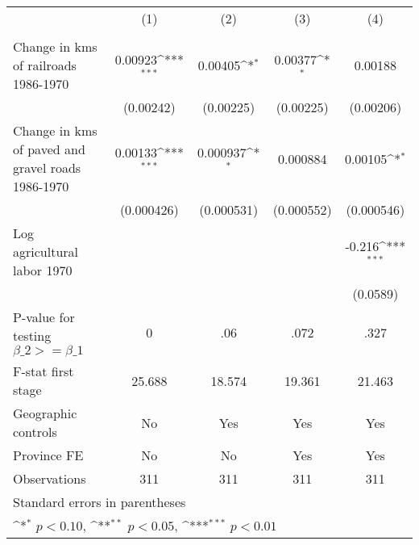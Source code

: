 {
\def\sym#1{\ifmmode^{#1}\else\(^{#1}\)\fi}
\begin{tabular}{l*{4}{c}}
\hline\hline
                &\multicolumn{1}{c}{(1)}&\multicolumn{1}{c}{(2)}&\multicolumn{1}{c}{(3)}&\multicolumn{1}{c}{(4)}\\
                &\multicolumn{1}{c}{}&\multicolumn{1}{c}{}&\multicolumn{1}{c}{}&\multicolumn{1}{c}{}\\
\hline
Change in kms of railroads 1986-1970&  0.00923\sym{***}&  0.00405\sym{*}  &  0.00377\sym{*}  &  0.00188         \\
                &(0.00242)         &(0.00225)         &(0.00225)         &(0.00206)         \\
[1em]
Change in kms of paved and gravel roads 1986-1970&  0.00133\sym{***}& 0.000937\sym{*}  & 0.000884         &  0.00105\sym{*}  \\
                &(0.000426)         &(0.000531)         &(0.000552)         &(0.000546)         \\
[1em]
Log agricultural labor 1970&                  &                  &                  &   -0.216\sym{***}\\
                &                  &                  &                  & (0.0589)         \\
\hline
P-value for testing $\beta\_{2} >= \beta\_{1}$&        0         &      .06         &     .072         &     .327         \\
F-stat first stage&   25.688         &   18.574         &   19.361         &   21.463         \\
Geographic controls&       No         &      Yes         &      Yes         &      Yes         \\
Province FE     &       No         &       No         &      Yes         &      Yes         \\
Observations    &      311         &      311         &      311         &      311         \\
\hline\hline
\multicolumn{5}{l}{\footnotesize Standard errors in parentheses}\\
\multicolumn{5}{l}{\footnotesize \sym{*} \(p<0.10\), \sym{**} \(p<0.05\), \sym{***} \(p<0.01\)}\\
\end{tabular}
}
